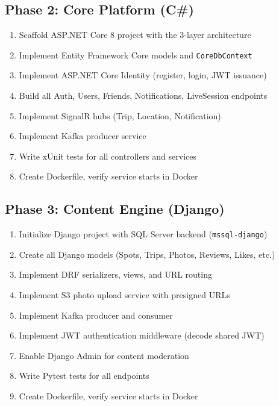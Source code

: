 \documentclass[12pt,letterpaper]{article}
\begin{document}
\subsection{Phase 2: Core Platform (C\#)}
\begin{enumerate}
  \item Scaffold ASP.NET Core 8 project with the 3-layer architecture
  \item Implement Entity Framework Core models and \texttt{CoreDbContext}
  \item Implement ASP.NET Core Identity (register, login, JWT issuance)
  \item Build all Auth, Users, Friends, Notifications, LiveSession endpoints
  \item Implement SignalR hubs (Trip, Location, Notification)
  \item Implement Kafka producer service
  \item Write xUnit tests for all controllers and services
  \item Create Dockerfile, verify service starts in Docker
\end{enumerate}

\subsection{Phase 3: Content Engine (Django)}
\begin{enumerate}
  \item Initialize Django project with SQL Server backend (\texttt{mssql-django})
  \item Create all Django models (Spots, Trips, Photos, Reviews, Likes, etc.)
  \item Implement DRF serializers, views, and URL routing
  \item Implement S3 photo upload service with presigned URLs
  \item Implement Kafka producer and consumer
  \item Implement JWT authentication middleware (decode shared JWT)
  \item Enable Django Admin for content moderation
  \item Write Pytest tests for all endpoints
  \item Create Dockerfile, verify service starts in Docker
\end{enumerate}
\end{document}
